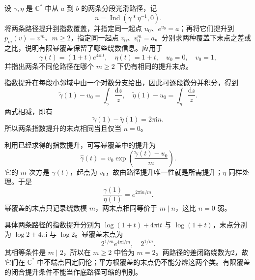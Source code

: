 \begin{exercise}\label{b3:ex:11-1}
设 \(\gamma,\eta\) 是 \(\mathbb C^*\) 中从 \(a\) 到 \(b\) 的两条分段光滑路径，记
\[
 n=\operatorname{Ind}(\gamma*\eta^{-1},0).
\]
将两条路径提升到指数覆盖，并指定同一起点 \(u_0\)、\(e^{u_0}=a\)；再将它们提升到 \(p_m(v)=v^m\)、\(m\ge2\)，指定同一起点 \(v_0\)、\(v_0^m=a\)。分别求两种覆盖下末点之差或之比，说明有限幂覆盖保留了哪些绕数信息。应用于
\[
 \gamma(t)=(1+t)e^{4\pi\mathrm i t},\quad
 \eta(t)=1+t,\quad u_0=0,\quad v_0=1,
\]
并指出两条不同伦路径在哪个 \(m\ge2\) 下仍有相同的提升末点。
\end{exercise}
\begin{solution}
指数提升在每段小邻域中由一个对数分支给出，因此可逐段微分并积分，得到
\[
 \widetilde\gamma(1)-u_0=\int_\gamma\frac{\mathrm dz}{z},\quad
 \widetilde\eta(1)-u_0=\int_\eta\frac{\mathrm dz}{z}.
\]
两式相减，即有
\[
 \widetilde\gamma(1)-\widetilde\eta(1)=2\pi\mathrm i n.
\]
所以两条指数提升的末点相同当且仅当 \(n=0\)。

利用已经求得的指数提升，可写幂覆盖中的提升为
\[
 \widehat\gamma(t)=v_0
       \exp\left(\frac{\widetilde\gamma(t)-u_0}{m}\right).
\]
它的 \(m\) 次方是 \(\gamma(t)\)，起点为 \(v_0\)，故由路径提升唯一性就是所需提升；\(\eta\) 同样处理。于是
\[
 \frac{\widehat\gamma(1)}{\widehat\eta(1)}
 =e^{2\pi\mathrm i n/m}.
\]
幂覆盖的末点只记录绕数模 \(m\)，两末点相同等价于 \(m\mid n\)，这比 \(n=0\) 弱。

具体两条路径的指数提升分别为 \(\log(1+t)+4\pi\mathrm i t\) 与 \(\log(1+t)\)，末点分别为 \(\log2+4\pi\mathrm i\) 与 \(\log2\)。幂覆盖末点为
\[
 2^{1/m}e^{4\pi\mathrm i/m},\quad 2^{1/m}.
\]
其相等条件是 \(m\mid2\)，所以在 \(m\ge2\) 中恰为 \(m=2\)。两路径的差闭路绕数为2，故它们在 \(\mathbb C^*\) 中不端点固定同伦；平方根覆盖的末点仍不能分辨这两个类。有限覆盖的闭合提升条件不能当作底路径可缩的判别。
\end{solution}

